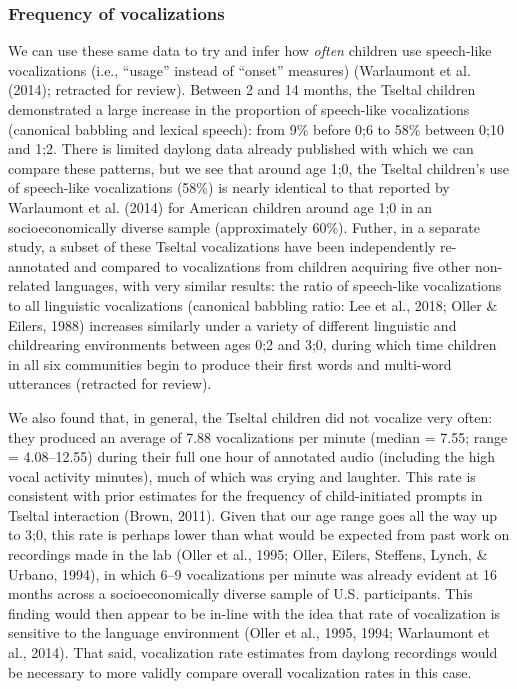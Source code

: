\documentclass[floatsintext,man]{apa6}
\theoremstyle{definition}
\theoremstyle{definition}
\theoremstyle{definition}
\theoremstyle{remark}
\begin{document}
\subsubsection{Frequency of
vocalizations}\label{frequency-of-vocalizations}

We can use these same data to try and infer how \emph{often} children
use speech-like vocalizations (i.e., \enquote{usage} instead of
\enquote{onset} measures) (Warlaumont et al. (2014); retracted for
review). Between 2 and 14 months, the Tseltal children demonstrated a
large increase in the proportion of speech-like vocalizations (canonical
babbling and lexical speech): from 9\% before 0;6 to 58\% between 0;10
and 1;2. There is limited daylong data already published with which we
can compare these patterns, but we see that around age 1;0, the Tseltal
children's use of speech-like vocalizations (58\%) is nearly identical
to that reported by Warlaumont et al. (2014) for American children
around age 1;0 in an socioeconomically diverse sample (approximately
60\%). Futher, in a separate study, a subset of these Tseltal
vocalizations have been independently re-annotated and compared to
vocalizations from children acquiring five other non-related languages,
with very similar results: the ratio of speech-like vocalizations to all
linguistic vocalizations (canonical babbling ratio: Lee et al., 2018;
Oller \& Eilers, 1988) increases similarly under a variety of different
linguistic and childrearing environments between ages 0;2 and 3;0,
during which time children in all six communities begin to produce their
first words and multi-word utterances (retracted for review).

We also found that, in general, the Tseltal children did not vocalize
very often: they produced an average of 7.88 vocalizations per minute
(median = 7.55; range = 4.08--12.55) during their full one hour of
annotated audio (including the high vocal activity minutes), much of
which was crying and laughter. This rate is consistent with prior
estimates for the frequency of child-initiated prompts in Tseltal
interaction (Brown, 2011). Given that our age range goes all the way up
to 3;0, this rate is perhaps lower than what would be expected from past
work on recordings made in the lab (Oller et al., 1995; Oller, Eilers,
Steffens, Lynch, \& Urbano, 1994), in which 6--9 vocalizations per
minute was already evident at 16 months across a socioeconomically
diverse sample of U.S. participants. This finding would then appear to
be in-line with the idea that rate of vocalization is sensitive to the
language environment (Oller et al., 1995, 1994; Warlaumont et al.,
2014). That said, vocalization rate estimates from daylong recordings
would be necessary to more validly compare overall vocalization rates in
this case.
\end{document}
